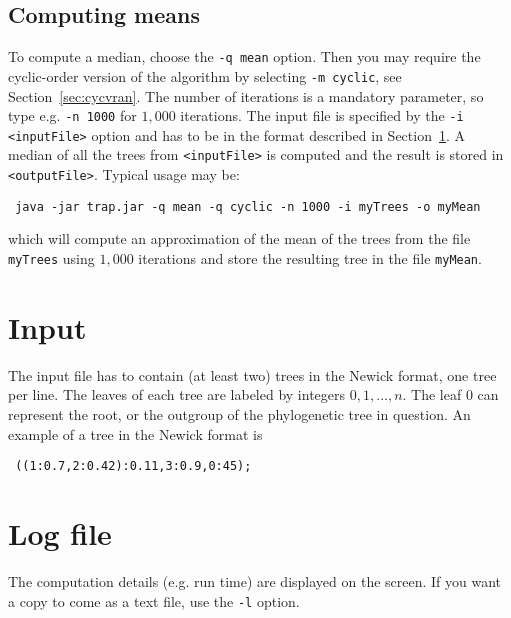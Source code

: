 \documentclass[a4paper,12pt]{amsart}
\begin{document}
\subsection{Computing means}
To compute a median, choose the \texttt{-q mean} option. Then you may require the cyclic-order version of the algorithm by selecting \texttt{-m cyclic}, see Section~\ref{sec:cycvran}. The number of iterations is a mandatory parameter, so type e.g. \texttt{-n 1000} for $1,000$ iterations. The input file is specified by the \texttt{-i <inputFile>} option and has to be in the format described in Section~\ref{sec:input}. A median of all the trees from \texttt{<inputFile>} is computed and the result is stored in \texttt{<outputFile>}. Typical usage may be:
\begin{verbatim}
 java -jar trap.jar -q mean -q cyclic -n 1000 -i myTrees -o myMean
\end{verbatim}
which will compute an approximation of the mean of the trees from the file \texttt{myTrees} using $1,000$ iterations and store the resulting tree in the file \texttt{myMean}.



\section{Input} \label{sec:input}
The input file has to contain (at least two) trees in the Newick format, one tree per line. The leaves of each tree are labeled by integers $0,1,\dots,n.$ The leaf $0$ can represent the root, or the outgroup of the phylogenetic tree in question. An example of a tree in the Newick format is
\begin{verbatim}
 ((1:0.7,2:0.42):0.11,3:0.9,0:45);
\end{verbatim}



\section{Log file}
The computation details (e.g. run time) are displayed on the screen. If you want a copy to come as a text file, use the \texttt{-l} option.
\end{document}
